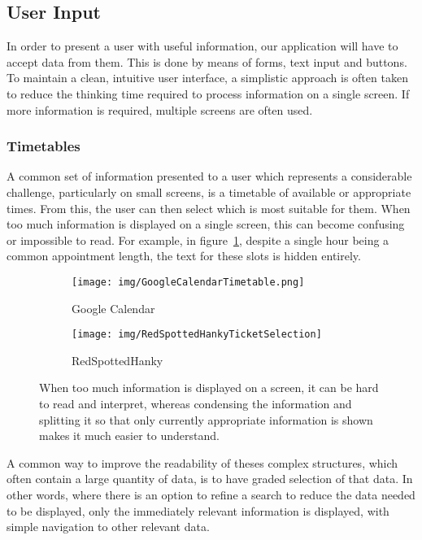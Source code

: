 \subsection{User Input}
\label{sub:user_input}

In order to present a user with useful information, our application will have
to accept data from them. This is done by means of forms, text input and
buttons. To maintain a clean, intuitive user interface, a simplistic approach
is often taken to reduce the thinking time required to process information on a
single screen. If more information is required, multiple screens are often
used.

\subsubsection{Timetables}
\label{ssub:timetables}

A common set of information presented to a user which represents a considerable
challenge, particularly on small screens, is a timetable of available or
appropriate times. From this, the user can then select which is most suitable
for them. When too much information is displayed on a single screen, this can
become confusing or impossible to read. For example, in
figure~\ref{fig:GoogleCalendarTimetable}\cite{GoogleCalendar}, despite a single
hour being a common appointment length, the text for these slots is hidden
entirely.

\begin{figure}[ht]
    \centering
    \begin{subfigure}[b]{0.25\textwidth}
        \texttt{[image: img/GoogleCalendarTimetable.png]}
        \caption{Google Calendar}\label{fig:GoogleCalendarTimetable}
    \end{subfigure}%
    \qquad
    \begin{subfigure}[b]{0.25\textwidth}
        \texttt{[image: img/RedSpottedHankyTicketSelection]}
        \caption{RedSpottedHanky}\label{fig:RedSpottedHankyTicketSelection}
    \end{subfigure}
    \caption{When too much information is displayed on a screen, it can be
    hard to read and interpret, whereas condensing the information and
    splitting it so that only currently appropriate information is shown
    makes it much easier to understand.}\label{fig:timetables}
\end{figure}

A common way to improve the readability of theses complex structures, which
often contain a large quantity of data, is to have graded selection of that
data. In other words, where there is an option to refine a search to reduce the
data needed to be displayed, only the  immediately relevant information is
displayed, with simple navigation to other relevant data.

